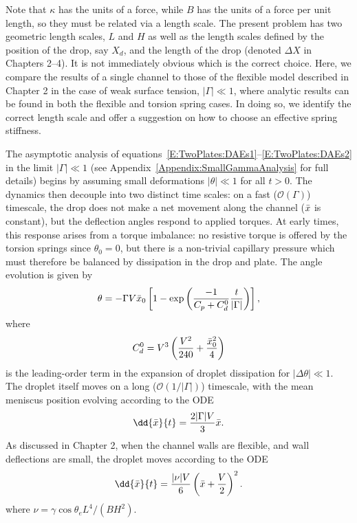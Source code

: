 Note that $\kappa$ has the units of a force, while $B$ has the units of a force per unit length, so they must be related via a length scale. The present problem has two geometric length scales, $L$ and $H$ as well as the length scales defined by the position of the drop, say $X_d$, and the length of the drop (denoted $\Delta X$ in Chapters 2--4). It is not immediately obvious which is the correct choice. Here, we compare the results of a single channel to those of the flexible model described in Chapter 2 in the case of weak surface tension, $|\Gamma| \ll 1$, where analytic results can be found in both the flexible and torsion spring cases. In doing so, we identify the correct length scale and offer a suggestion on how to choose an effective spring stiffness.

The asymptotic analysis of equations~\eqref{E:TwoPlates:DAEs1}--\eqref{E:TwoPlates:DAEs2} in the limit $|\Gamma |\ll 1$ (see Appendix~\ref{Appendix:SmallGammaAnalysis} for full details) begins by assuming small deformations $|\theta| \ll 1$ for all $t>0$. The dynamics then decouple into two distinct time scales: on a fast ($\mathcal{O}(\Gamma)$) timescale, the drop does not make a net movement along the channel ($\bar{x}$ is constant), but the deflection angles respond to applied torques. At early times, this response arises from a torque imbalance: no resistive torque is offered by the torsion springs since $\theta_0 = 0$, but there is a non-trivial capillary pressure which must therefore be balanced by dissipation in the drop and plate. The angle evolution is given by
\begin{equation}\label{E:SingleChannel:SmallGamma:FastTimescaleEq}
\theta = -\Gamma V \bar{x}_0\left[1 - \exp\left(\frac{-1}{C_p + C_{d}^0}\frac{t}{|\Gamma|}\right)\right],
\end{equation}
where
\begin{equation}\label{E:SingleChannel:SmallGamma:SlowTimescaleEq}
C_{d}^0 = V^3\left(\frac{V^2}{240} + \frac{\bar{x}_0^2}{4}\right)
\end{equation}
is the leading-order term in the expansion of droplet dissipation for $|\Delta \theta| \ll 1$. The droplet itself moves on a long ($\mathcal{O}(1/|\Gamma|)$) timescale, with the mean meniscus position evolving according to the ODE
\begin{equation}\label{E:SingleChannel:SmallGamma:xbarODE}
\dd{\xbar}{t} = \frac{2|\Gamma|V}{3}\xbar.
\end{equation}
As discussed in Chapter 2, when the channel walls are flexible, and wall deflections are small, the droplet moves according to the ODE
\begin{equation}\label{E:SingleChannel:SmallGamma:xbarODE_flexible}
\dd{\xbar}{t} = \frac{|\nu| V}{6}\left(\xbar + \frac{V}{2}\right)^2.
\end{equation}
where $\nu = \gamma \cos \theta_e L^4/(BH^2)$.

